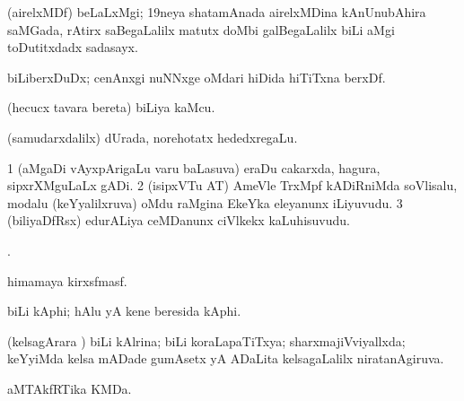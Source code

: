 {{{{{{\bentry
{} 
\gl{\nA}
\expl{}
\bmng
(airelxMDf) beLaLxMgi; 19neya shatamAnada airelxMDina kAnUnubAhira saMGada, rAtirx saBegaLalilx matutx doMbi galBegaLalilx biLi aMgi toDutitxdadx sadasayx. 
\emng
\eentry

\bentry
{} 
\gl{\nA}
\expl{}
\bmng
biLiberxDuDx; cenAnxgi nuNNxge oMdari hiDida hiTiTxna berxDf. 
\emng
\eentry

\bentry
{} 
\gl{\nA}
\expl{}
\bmng
(hecucx tavara bereta) biLiya kaMcu. 
\emng
\eentry

\bentry
{} 
\gl{\nA}
\expl{}
\bmng
(samudarxdalilx) dUrada, norehotatx hededxregaLu. 
\emng
\eentry

\bentry
{} 
\gl{\nA}
\expl{}
\bmng
{} 
\emng
\eentry

\bentry
{} 
\gl{\nA}
\expl{}
\bmng
\bnum
\num{1} (aMgaDi vAyxpArigaLu \mo varu baLasuva) eraDu cakarxda, hagura, sipxrXMguLaLx gADi. 
\num{2} (isipxVTu AT) AmeVle TrxMpf kADiRniMda soVlisalu, modalu (keYyalilxruva) oMdu raMgina EkeYka eleyanunx iLiyuvudu. 
\num{3} (biliyaDfRsx) edurALiya ceMDanunx ciVlkekx kaLuhisuvudu. 
\enum
\emng
\eentry

\bentry
{}
\gl{\nA}
\bmng
{}. 
\emng
\eentry

\bentry
{}
 \gl{\nA}\bmng
himamaya kirxsfmasf. 
\emng
\eentry

\bentry
{}
 \gl{\nA}\bmng
{} 
\emng
\eentry

\bentry
{}
 \gl{\nA}\bmng
biLi kAphi; hAlu yA kene beresida kAphi. 
\emng
\eentry

\bentry
{} 
\gl{\gu}
\expl{}
\bmng
(kelsagArara \vi) biLi kAlrina; biLi koraLapaTiTxya; sharxmajiVviyallxda; keYyiMda kelsa mADade gumAsetx yA ADaLita kelsagaLalilx niratanAgiruva. 
\emng
\eentry

\bentry
{}
 \gl{\nA}\bmng
aMTAkfRTika KMDa. 
\emng
\eentry

\bentry
{}
\gl{\nA}
\bmng
{} 
\emng
\eentry

}}}}}}
